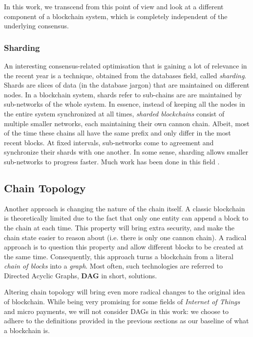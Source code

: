 In this work, we transcend from this point of view and look at a different component of a
blockchain system, which is completely independent of the underlying consensus.

\subsubsection{Sharding}

An interesting consensus-related optimisation that is gaining a lot of relevance in the recent year
is a technique, obtained from the databases field, called \textit{sharding}. Shards are slices of data (in the
database jargon) that are maintained on different nodes. In a blockchain system, shards refer to
sub-chains are are maintained by sub-networks of the whole system. In essence, instead of keeping
all the nodes in the entire system synchronized at all times, \textit{sharded blockchains} consist of multiple
smaller networks, each maintaining their own cannon chain. Albeit, most of the time these chains all
have the same prefix and only differ in the most recent blocks. At fixed intervals, sub-networks
come to agreement and synchronize their shards with one another. In some sense, sharding allows
smaller sub-networks to progress faster. Much work has been done in this field
\cite{Forestier_Vodenicarevic_Laversanne_Finot_2019_block_qlique,
Al_Bassam_Sonnino_Bano_Hrycyszyn_Danezis_2017_chainspace,
Shrey_Singh_Sathya_Yogesh_2019_diep_trans}.

\subsection{Chain Topology}

Another approach is changing the nature of the chain itself. A classic blockchain is
theoretically limited due to the fact that only one entity can append a block to the chain at each time.
This property will bring extra security, and make the chain state easier to reason about (i.e. there
is only one cannon chain). A radical approach is to question this property and allow different
blocks to be created at the same time. Consequently, this approach turns a blockchain from a literal
\textit{chain of blocks} into a \textit{graph}. Most often, such technologies are
referred to Directed Acyclic Graphs, \textbf{DAG} in short, solutions.

Altering chain topology will bring even more radical changes to the original idea of blockchain. While being
very promising for some fields of \textit{Internet of Things} and micro payments, we will not
consider DAGs in this work: we choose to adhere to the definitions provided in the previous sections as our
baseline of what a blockchain is.

